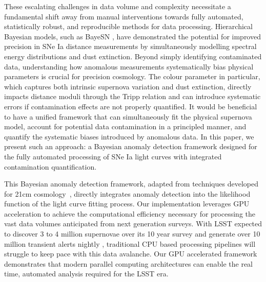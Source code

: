 These escalating challenges in data volume and complexity necessitate a fundamental shift away from manual interventions towards fully automated, statistically robust, and reproducible methods for data processing. Hierarchical Bayesian models, such as BayeSN \citep{Mandel2020, Thorp2021, Dhawan2022}, have demonstrated the potential for improved precision in SNe Ia distance measurements by simultaneously modelling spectral energy distributions and dust extinction. Beyond simply identifying contaminated data, understanding how anomalous measurements systematically bias physical parameters is crucial for precision cosmology. The colour parameter in particular, which captures both intrinsic supernova variation and dust extinction, directly impacts distance moduli through the Tripp relation and can introduce systematic errors if contamination effects are not properly quantified. It would be beneficial to have a unified framework that can simultaneously fit the physical supernova model, account for potential data contamination in a principled manner, and quantify the systematic biases introduced by anomalous data. In this paper, we present such an approach: a Bayesian anomaly detection framework designed for the fully automated processing of SNe Ia light curves with integrated contamination quantification.

This Bayesian anomaly detection framework, adapted from techniques developed for 21cm cosmology~\citep{Leeney2022, Anstey2023, Roque2023, de2022reach}, directly integrates anomaly detection into the likelihood function of the light curve fitting process. Our implementation leverages GPU acceleration to achieve the computational efficiency necessary for processing the vast data volumes anticipated from next generation surveys. With LSST expected to discover 3 to 4 million supernovae over its 10 year survey and generate over 10 million transient alerts nightly \citep{ivezic2019lsst}, traditional CPU based processing pipelines will struggle to keep pace with this data avalanche. Our GPU accelerated framework demonstrates that modern parallel computing architectures can enable the real time, automated analysis required for the LSST era.

